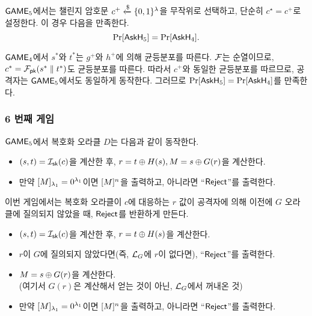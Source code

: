 $\game_5$에서는 챌린지 암호문 $c^+ \rgets \{0,1\}^{\sp}$을 무작위로 선택하고, 단순히
$c^\star = c^+$로 설정한다. 이 경우 다음을 만족한다.
$$
	\Pr[\askH_5] = \Pr[\askH_4].
$$

\begin{memo}
	$\game_4$에서 $s^*$와 $t^*$는 $g^+$와 $h^+$에 의해 균등분포를 따른다. $\td$는
	순열이므로, $c^* = \td_{\pk}(s^* \parallel t^*)$도 균등분포를 따른다. 따라서 $c^+$와
	동일한 균등분포를 따르므로, 공격자는 $\game_5$에서도 동일하게 동작한다.
	그러므로 $\Pr[\askH_5] = \Pr[\askH_4]$를 만족한다.
\end{memo}

\newpage
\subsubsection{6 번째 게임}

\begin{memo}
	$\game_5$에서 복호화 오라클 $D$는 다음과 같이 동작한다.
	\begin{tcolorbox}
		\begin{itemize}
			\item $(s,t) = \itd_{\sk}(\ct)$을 계산한 후, $r = t \xor \hash(s),
			M = s \xor \gash(\coin)$을 계산한다.
			\item 만약 $[M]_{\sp_1} = 0^{\sp_1}$이면 $[M]^{\mlen}$을 출력하고,
			아니라면 “$\reject$”를 출력한다.
		\end{itemize}
	\end{tcolorbox}
\end{memo}

이번 게임에서는 복호화 오라클이 $c$에 대응하는 $r$ 값이 공격자에 의해 이전에 $G$
오라클에 질의되지 않았을 때, $\reject$를 반환하게 만든다.

\begin{tcolorbox}
	\begin{itemize}
		\item $(s,t) = \itd_{\sk}(\ct)$을 계산한 후, $r = t \xor \hash(s)$을 계산한다.
		\item $r$이 $G$에 질의되지 않았다면(즉, $\orcl_G$에 $r$이 없다면), “$\reject$”를 출력한다.
		\item $M = s \xor G(r)$을 계산한다. \\ (여기서 $G(r)$은 계산해서 얻는 것이 아닌, $\orcl_G$에서 꺼내온 것)
		\item 만약 $[M]_{\sp_1} = 0^{\sp_1}$이면 $[M]^{\mlen}$을 출력하고,
		아니라면 “$\reject$”를 출력한다.
	\end{itemize}
\end{tcolorbox}

